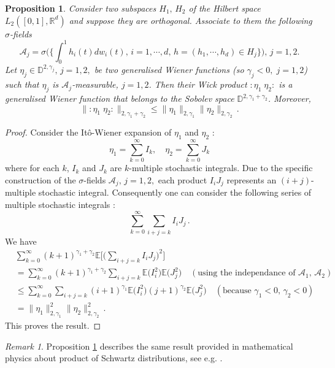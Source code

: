 \documentclass[]{interact}
\newcommand{\E}{{\mathbb{E}}}
\newcommand{\R}{{\mathbb{R}}}
\newcommand{\D}{{\mathbb{D}}}
\newcommand{\1}{\mathbf{1}}
\theoremstyle{plain}%
\newtheorem{prop}[thm]{Proposition}
\theoremstyle{definition}
\theoremstyle{remark}
\newtheorem{remark}{Remark}
\begin{document}
\begin{prop}\label{prop2} Consider two subspaces $H_1, \, H_2$ of the Hilbert space $L_2([0,1],\R^d)$ and suppose they are orthogonal. Associate to them the following $\sigma$-fields 
$$  \mathcal{A}_j=\sigma \Big( \Big\{ \int_0^1h_i(t)dw_i(t),\, i=1,\cdots,d, \, h=(h_1,\cdots, h_d)\in H_j \Big\}\Big), \, j=1,2. $$
Let $\eta _j \in \D^{2,\gamma_j},\, j=1,2,$ be two generalised Wiener functions (so $\gamma _j <0,\; j=1,2$) such that $\eta_j$ is $\mathcal{A}_j$-measurable, $j=1,2$. Then their Wick product $ :\eta_1\;\eta_2: $ is a generalised Wiener function that belongs to the Sobolev space $\D^{2,\gamma_1+\gamma_2}$. Moreover,
$$ \big \| :\eta_1\;\eta_2: \big\| _{2,\gamma_1+\gamma_2} \leqslant   \big \| \eta_1  \big\| _{2,\gamma_1 }  \big \| \eta_2 \big\| _{2,\gamma_2}\,. $$

\end{prop}




\begin{proof}
Consider the It\^{o}-Wiener expansion of $\eta_1$ and $\eta_2$ :
$$ \eta_1= \sum_{k= 0}^{\infty} I_k,\quad \eta_2= \sum_{k= 0}^{\infty} J_k $$
where for each $k$, $I_k$ and $J_k$ are $k$-multiple stochastic integrals. Due to the specific construction of the $\sigma$-fields $\mathcal{A}_j,\,j=1,2,$ each product $I_iJ_j$ represents an $(i+j)$-multiple stochastic integral. Consequently one can consider the following series of multiple stochastic integrals :
$$ \sum_{k= 0}^{\infty} \sum_{i+j=k} I_iJ_j\,. $$
We have 
\begin{align*}
& \sum_{k= 0}^{\infty} (k+1)^{\gamma_1+\gamma_2}\E \Bigg[ \Big( \sum_{i+j=k} I_iJ_j \Big)^2 \Bigg]\\
&=\sum_{k= 0}^{\infty} (k+1)^{\gamma_1+\gamma_2} \sum_{i+j=k} \E\big(I_i^2\big) \E \big(J_j ^2\big)\quad (\text{using the  independance of }\mathcal{A}_1,\, \mathcal{A}_2)\\
&\leqslant \sum_{k= 0}^{\infty}  \sum_{i+j=k} (i+1)^{\gamma_1 } \E\big(I_i^2\big) (j+1)^{ \gamma_2}\E \big(J_j ^2\big) \quad (\text{because } \gamma_1<0,\, \gamma_2<0 )\\
&=\big \| \eta_1  \big\| _{2,\gamma_1 }^2  \big \| \eta_2 \big\| _{2,\gamma_2}^2\,. 
\end{align*}
This proves the result.
\end{proof}



\begin{remark}
Proposition \ref{prop2} describes the same result provided in mathematical physics about product of Schwartz distributions, see e.g. \cite{Vlad71}.
\end{remark}
\end{document}
